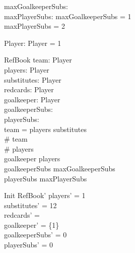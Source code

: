 \begin{axdef}
  maxGoalkeeperSubs: \nat \\
  maxPlayerSubs: \nat 
\where
  maxGoalkeeperSubs = 1\\
  maxPlayerSubs = 2
\end{axdef}

\begin{axdef}
  Player: \power  \nat 
\where
  Player = 1 
\end{axdef}

\begin{schema}{RefBook}
  team: \finset  Player\\
  players: \finset  Player\\
  substitutes: \finset  Player\\
  redcards: \finset  Player\\
  goalkeeper: \finset  Player\\
  goalkeeperSubs: \nat \\
  playerSubs: \nat \\
\where
  team = players \cup  substitutes \\%
  \# team \\
   \# players \\
  goalkeeper \subseteq  players\\
  goalkeeperSubs \leq  maxGoalkeeperSubs\\
  playerSubs \leq  maxPlayerSubs
\end{schema}

\begin{schema}{Init}
 RefBook'
\where
players' = 1 \\
substitutes' = 12 \\
redcards' = \emptyset\\
goalkeeper' = \{1\}\\
goalkeeperSubs' = 0\\
playerSubs' = 0\\
\end{schema}

